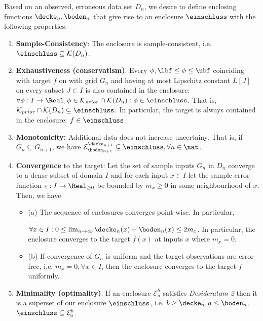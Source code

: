 \begin{defn}[Desiderata] \label{defn:desiderata}
 Based on an observed, erroneous data set $D_n$, we desire to define enclosing functions $\decke_n, \boden_n$ that give rise to an enclosure $\einschluss$ with the following properties:

\begin{enumerate} 

    \item \textbf{Sample-Consistency}: The enclosure is sample-consistent, i.e. $\einschluss \subseteq \mathcal K(D_n)$.
    
     \item \textbf{Exhaustiveness (conservatism)}: Every $\phi, \lbf \leq \phi \leq \ubf$ coinciding with target $f$ on with grid $G_n$ and
having at most Lipschitz
    constant $L[J]$ on every subset $J \subset I$ is also contained in the enclosure: $\forall \phi: I \to \Real, \phi \in \mathcal K_{prior} \cap \mathcal K(D_n): \phi \in \einschluss $. That is, $\mathcal K_{prior} \cap \mathcal K(D_n) \subseteq \einschluss$.
    In particular, the target is always contained in the enclosure: $f \in \einschluss$.

\item \textbf{Monotonicity:} Additional data does not increase uncertainy. That is,
if $G_n \subseteq G_{n+1} $, we have $\mathcal E^{\decke_{n+1}}_{\boden_{n+1}} \subseteq \einschluss, \forall n \in \nat$.
		   
\item \textbf{Convergence} to the target: Let the set of sample inputs $G_n$ in $D_n$ converge to a dense subset of domain $I$ and for each input $x \in I$ let the sample error function $\varepsilon: I \to \Real_{\geq 0}$ be bounded by $m_x \geq 0$ in some neighbourhood of $x$. Then, we have 
\begin{itemize}
\item (a) The sequence of enclosures converges point-wise. In particular, 

$\forall x \in I: 0 \leq \lim_{n \to \infty} \decke_n (x) -\boden_n(x) \leq 2 m_x$.
In particular, the enclosure converges to the target $f(x)$ at inputs $x$ where $m_x=0$.  
		
		\item (b) If convergence of $G_n$ is uniform and the target observations are error-free, i.e. $m_x = 0, \forall x \in I$, then the enclosure converges to the target $f$ uniformly.
\end{itemize}	
   \item \textbf{Minimality (optimality)}: 
If an enclosure $\mathcal E^b_a$  satisfies \emph{Desideratum 2} then it is a superset of our enclosure $\einschluss$, i.e. $b \geq \decke_n, a \leq \boden_n$, $\einschluss \subseteq \mathcal E^b_a$.    

\end{enumerate}

\end{defn}
 

